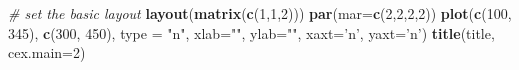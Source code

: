 \documentclass[]{article}
\newenvironment{Shaded}{\begin{snugshade}}{\end{snugshade}}
\newcommand{\CommentTok}[1]{\textcolor[rgb]{0.56,0.35,0.01}{\textit{#1}}}
\newcommand{\DataTypeTok}[1]{\textcolor[rgb]{0.13,0.29,0.53}{#1}}
\newcommand{\DecValTok}[1]{\textcolor[rgb]{0.00,0.00,0.81}{#1}}
\newcommand{\KeywordTok}[1]{\textcolor[rgb]{0.13,0.29,0.53}{\textbf{#1}}}
\newcommand{\NormalTok}[1]{#1}
\newcommand{\StringTok}[1]{\textcolor[rgb]{0.31,0.60,0.02}{#1}}
\begin{document}
\begin{Shaded}
\begin{Highlighting}[]
  \CommentTok{# set the basic layout}
  \KeywordTok{layout}\NormalTok{(}\KeywordTok{matrix}\NormalTok{(}\KeywordTok{c}\NormalTok{(}\DecValTok{1}\NormalTok{,}\DecValTok{1}\NormalTok{,}\DecValTok{2}\NormalTok{)))}
  \KeywordTok{par}\NormalTok{(}\DataTypeTok{mar=}\KeywordTok{c}\NormalTok{(}\DecValTok{2}\NormalTok{,}\DecValTok{2}\NormalTok{,}\DecValTok{2}\NormalTok{,}\DecValTok{2}\NormalTok{))}
  \KeywordTok{plot}\NormalTok{(}\KeywordTok{c}\NormalTok{(}\DecValTok{100}\NormalTok{, }\DecValTok{345}\NormalTok{), }\KeywordTok{c}\NormalTok{(}\DecValTok{300}\NormalTok{, }\DecValTok{450}\NormalTok{), }\DataTypeTok{type =} \StringTok{"n"}\NormalTok{, }\DataTypeTok{xlab=}\StringTok{""}\NormalTok{, }\DataTypeTok{ylab=}\StringTok{""}\NormalTok{, }\DataTypeTok{xaxt=}\StringTok{'n'}\NormalTok{, }\DataTypeTok{yaxt=}\StringTok{'n'}\NormalTok{)}
  \KeywordTok{title}\NormalTok{(title, }\DataTypeTok{cex.main=}\DecValTok{2}\NormalTok{)}


\end{Highlighting}
\end{Shaded}
\end{document}
